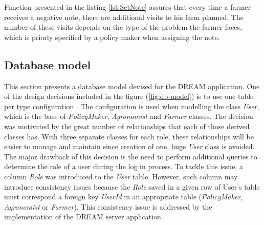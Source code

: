 

Function presented in the listing \ref{lst:SetNote} assures that every time a farmer receives a negative note, there are additional visits to his farm planned. The number of these visits depends on the type of the problem the farmer faces, which is priorly specified by a policy maker when assigning the note.



\subsection{Database model}

This section presents a database model devised for the DREAM application. One of the design decisions included in the figure (\ref{fig:db-model}) is to use one table per type configuration \cite{ef-Inheritance}. The configuration is used when modelling the class \textit{User}, which is the base of \textit{PolicyMaker}, \textit{Agronomist} and \textit{Farmer} classes. The decision was motivated by the great number of relationships that each of those derived classes has. With three separate classes for each role, these relationships will be easier to manage and maintain since creation of one, huge \textit{User} class is avoided. The major drawback of this decision is the need to perform additional queries to determine the role of a user during the log in process. To tackle this issue, a column \textit{Role} was introduced to the \textit{User} table. However, such column may introduce consistency issues because the \textit{Role} saved in a given row of User's table must correspond a foreign key \textit{UserId} in an appropriate table (\textit{PolicyMaker}, \textit{Agronomist} or \textit{Farmer}). This consistency issue is addressed by the implementation of the DREAM server application.


